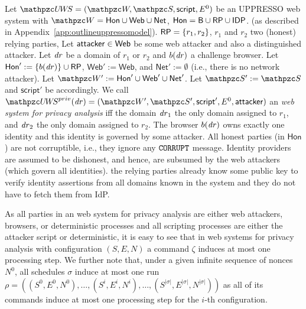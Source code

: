 \begin{theorem}
  \begin{definition}\label{def:uppresso-ws-priv}
    Let $\uppressowebsystem = (\bidsystem, \scriptset, 
    \mathsf{script}, E^0)$ be an UPPRESSO web system with 
    $\bidsystem = \mathsf{Hon} \cup \mathsf{Web} \cup \mathsf{Net}$, 
    $\mathsf{Hon} = \mathsf{B} \cup \mathsf{RP} \cup \mathsf{IDP}$.
    (as described in Appendix~\ref{app:outlineuppressomodel}).
    $\mathsf{RP} = \{r_1,r_2\}$, $r_1$ and $r_2$ two (honest) relying parties,
    Let $\mathsf{attacker} \in \mathsf{Web}$ be some web attacker and also a distinguished attacker.
    Let $\mathit{dr}$ be a domain of $r_1$ or $r_2$ and $b(\mathit{dr})$ a challenge browser. 
    Let $\mathsf{Hon}' := \{ b(\mathit{dr}) \} \cup \mathsf{RP}$, 
    $\mathsf{Web}' := \mathsf{Web}$, 
    and $\mathsf{Net}' := \emptyset$ (i.e., there is no network attacker).
    Let $\bidsystem' := \mathsf{Hon}' \cup \mathsf{Web}' \cup \mathsf{Net}'$.  
    Let $\scriptset' := \scriptset$ and $\mathsf{script}'$ be accordingly.
    We call $\uppressoprivwebsystem(\mi{dr}) = (\bidsystem', \scriptset', \mathsf{script}', E^0, \fAP{attacker})$ 
    an \emph{\uppresso web system for privacy analysis} 
    iff the domain $\mathit{dr}_1$ the only domain assigned to $r_1$, and
    $\mathit{dr}_2$ the only domain assigned to $r_2$. The browser
    $b(\mathit{dr})$ owns exactly one identity and this identity
    is governed by some attacker.  All honest parties (in
    $\mathsf{Hon}$) are not corruptible, i.e., they ignore any
    $\mathtt{CORRUPT}$ message. Identity providers are assumed to be
    dishonest, and hence, are subsumed by the web attackers (which
    govern all identities). %
    the relying
    parties already know some public key to verify \uppresso identity
    assertions from all domains known in the system and they do not have to fetch them from IdP.
  \end{definition}
  
  As all parties in an \uppresso web system for privacy analysis are either web 
  attackers, browsers, or deterministic processes and all scripting processes are 
  either the attacker script or deterministic, it is easy to see that in \uppresso 
  web systems for privacy analysis with configuration $(S,E,N)$ a command $\zeta$ 
  induces at most one processing step. We further note that, under a given infinite 
  sequence of nonces $N^0$, all schedules $\sigma$ induce at most one run 
  $\rho = ((S^0,E^0,N^0),\dots,(S^i,E^i,N^i),\dots,(S^{|\sigma|},E^{|\sigma|},N^{|\sigma|}))$ 
  as all of its commands induce at most one processing step for the $i$-th configuration.
  

\end{theorem}
